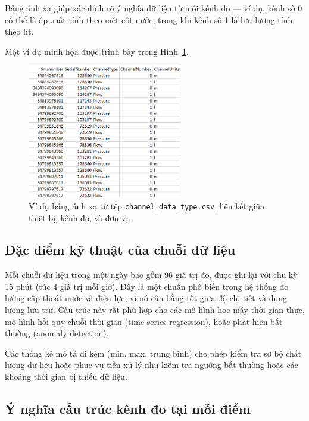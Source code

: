 \noindent
Bảng ánh xạ giúp xác định rõ ý nghĩa dữ liệu từ mỗi kênh đo — ví dụ, kênh số 0 có thể là áp suất tính theo mét cột nước, trong khi kênh số 1 là lưu lượng tính theo lít.

\vspace{0.5em}
Một ví dụ minh họa được trình bày trong Hình~\ref{fig:channel_mapping_table}.

\begin{figure}[htbp]
    \centering
    \includegraphics[width=0.6\textwidth]{image/section6_1/channel_mapping_table.png}
    \caption{Ví dụ bảng ánh xạ từ tệp \texttt{channel\_data\_type.csv}, liên kết giữa thiết bị, kênh đo, và đơn vị.}
    \label{fig:channel_mapping_table}
\end{figure}

\subsection{Đặc điểm kỹ thuật của chuỗi dữ liệu}

Mỗi chuỗi dữ liệu trong một ngày bao gồm 96 giá trị đo, được ghi lại với chu kỳ 15 phút (tức 4 giá trị mỗi giờ). Đây là một chuẩn phổ biến trong hệ thống đo lường cấp thoát nước và điện lực, vì nó cân bằng tốt giữa độ chi tiết và dung lượng lưu trữ. Cấu trúc này rất phù hợp cho các mô hình học máy thời gian thực, mô hình hồi quy chuỗi thời gian (time series regression), hoặc phát hiện bất thường (anomaly detection).

Các thống kê mô tả đi kèm (min, max, trung bình) cho phép kiểm tra sơ bộ chất lượng dữ liệu hoặc phục vụ tiền xử lý như kiểm tra ngưỡng bất thường hoặc các khoảng thời gian bị thiếu dữ liệu.

\subsection{Ý nghĩa cấu trúc kênh đo tại mỗi điểm}

